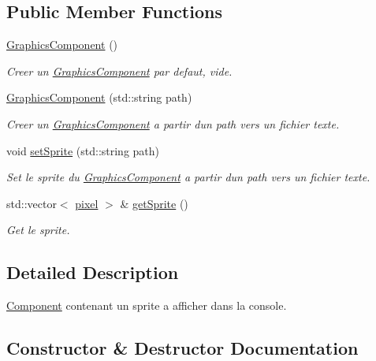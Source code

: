\subsection*{Public Member Functions}
\begin{DoxyCompactItemize}
\item 
\hypertarget{class_graphics_component_a67fc1b715989a5e18d32e26b27a55c50}{}\label{class_graphics_component_a67fc1b715989a5e18d32e26b27a55c50} 
\hyperlink{class_graphics_component_a67fc1b715989a5e18d32e26b27a55c50}{Graphics\+Component} ()
\begin{DoxyCompactList}\small\item\em Creer un \hyperlink{class_graphics_component}{Graphics\+Component} par defaut, vide. \end{DoxyCompactList}\item 
\hyperlink{class_graphics_component_af9c775bcb7f51c76c25d32b3152cd5b2}{Graphics\+Component} (std\+::string path)
\begin{DoxyCompactList}\small\item\em Creer un \hyperlink{class_graphics_component}{Graphics\+Component} a partir d\textquotesingle{}un path vers un fichier texte. \end{DoxyCompactList}\item 
void \hyperlink{class_graphics_component_ab3e309ee0a8dcbc1b927d38bf2e1d8c9}{set\+Sprite} (std\+::string path)
\begin{DoxyCompactList}\small\item\em Set le sprite du \hyperlink{class_graphics_component}{Graphics\+Component} a partir d\textquotesingle{}un path vers un fichier texte. \end{DoxyCompactList}\item 
std\+::vector$<$ \hyperlink{structpixel}{pixel} $>$ \& \hyperlink{class_graphics_component_aa88d6da1d4cceb7bf2b16c0419312517}{get\+Sprite} ()
\begin{DoxyCompactList}\small\item\em Get le sprite. \end{DoxyCompactList}\end{DoxyCompactItemize}


\subsection{Detailed Description}
\hyperlink{class_component}{Component} contenant un sprite a afficher dans la console. 

\subsection{Constructor \& Destructor Documentation}
\hypertarget{class_graphics_component_af9c775bcb7f51c76c25d32b3152cd5b2}{}\label{class_graphics_component_af9c775bcb7f51c76c25d32b3152cd5b2} 
